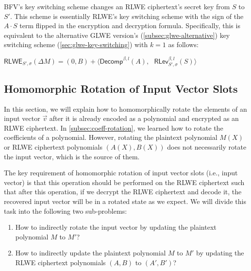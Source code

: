 BFV's key switching scheme changes an RLWE ciphertext's secret key from $S$ to $S'$. This scheme is essentially RLWE's key switching scheme with the sign of the $A\cdot S$ term flipped in the encryption and decryption formula. Specifically, this is equivalent to the alternative GLWE version's (\autoref{subsec:glwe-alternative}) key switching scheme (\autoref{sec:glwe-key-switching}) with $k = 1$ as follows:

\begin{tcolorbox}[title={\textbf{\tboxlabel{\ref*{subsec:bfv-key-switching}} BFV's Key Switching}}]
$\textsf{RLWE}_{S',\sigma}(\Delta M) = (0, B) + \bm{\langle} \textsf{Decomp}^{\beta, l}(A), \text{ } \textsf{RLev}_{S', \sigma}^{\beta, l}(S) \bm{\rangle}$
\end{tcolorbox}




\subsection{Homomorphic Rotation of Input Vector Slots}
\label{subsec:bfv-rotation}


In this section, we will explain how to homomorphically rotate the elements of an input vector $\vec{v}$ after it is already encoded as a polynomial and encrypted as an RLWE ciphertext. In \autoref{subsec:coeff-rotation}, we learned how to rotate the coefficients of a polynomial. However, rotating the plaintext polynomial $M(X)$ or RLWE ciphertext polynomials $(A(X), B(X))$ does not necessarily rotate the input vector, which is the source of them. 

The key requirement of homomorphic rotation of input vector slots (i.e., input vector) is that this operation should be performed on the RLWE ciphertext such that after this operation, if we decrypt the RLWE ciphertext and decode it, the recovered input vector will be in a rotated state as we expect. We will divide this task into the following two sub-problems:

\begin{enumerate}[leftmargin=3\parindent]
\item How to indirectly rotate the input vector by updating the plaintext polynomial $M$ to $M'$?

\item How to indirectly update the plaintext polynomial $M$ to $M'$ by updating the RLWE ciphertext polynomials $(A, B)$ to $(A', B')$?
\end{enumerate}



